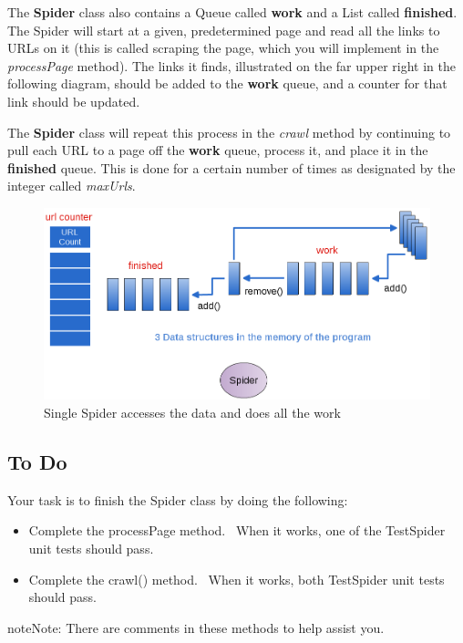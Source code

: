 \documentclass[letterpaper,10pt,openany,oneside]{sphinxmanual}
\begin{document}
The \textbf{Spider} class also contains a Queue called \textbf{work} and a List called \textbf{finished}.
The Spider will start at a given, predetermined page and read all the links to URLs on it (this
is called scraping the page, which you will implement in the \emph{processPage} method).
The links it finds, illustrated on the far upper right in the following diagram,
should be added to the \textbf{work} queue, and a counter for that link should be updated.

The \textbf{Spider} class will repeat this process in the \emph{crawl} method
by continuing to pull each URL to a page off the \textbf{work} queue, process it, and place
it in the \textbf{finished} queue.  This is done for a certain number of times as designated by the
integer called \emph{maxUrls}.
\begin{figure}[htbp]
\centering
\capstart

\includegraphics{Spider1.png}
\caption{Single Spider accesses the data and does all the work}\end{figure}


\subsection{To Do}
\label{TheSpiderLabonecrawler/TheSpiderLabonecrawler:to-do}
Your task is to finish the Spider class by doing the following:
\begin{itemize}
\item {} 
Complete the processPage method.  When it works, one of the TestSpider unit tests should pass.

\item {} 
Complete the crawl() method.  When it works, both TestSpider unit tests should pass.

\end{itemize}

\begin{notice}{note}{Note:}
There are comments in these methods to help assist you.
\end{notice}
\end{document}
